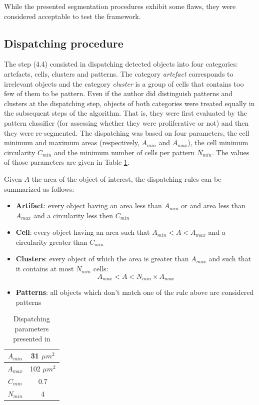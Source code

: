 While the presented segmentation procedures exhibit some flaws, they were considered acceptable to test the  framework.

\subsection{Dispatching procedure}

The step (4.4) consisted in dispatching detected objects into four categories: artefacts, cells, clusters and patterns. The category \textit{artefact} corresponds to irrelevant objects and the category \textit{cluster} is a group of cells that contains too few of them to be pattern. Even if the author did distinguish patterns and clusters at the dispatching step, objects of both categories were treated equally in the subsequent steps of the algorithm. That is, they were first evaluated by the pattern classifier (for assessing whether they were proliferative or not) and then they were re-segmented. The dispatching was based on four parameters, the cell minimum and maximum areas (respectively, $A_{min}$ and $A_{max}$), the cell minimum circularity $C_{min}$ and the minimum number of cells per pattern $N_{min}$. The values of those parameters are given in Table \ref{tab:adeb_disp_rules}. 

Given $A$ the area of the object of interest, the dispatching rules can be summarized as follows:

\begin{itemize}
	\item \textbf{Artifact}: every object having an area less than $A_{min}$ or and area less than $A_{max}$ and a circularity less then $C_{min}$
	\item \textbf{Cell}: every object having an area such that $A_{min} < A < A_{max}$ and a circularity greater than $C_{min}$
	\item \textbf{Clusters}: every object of which the area is greater than $A_{max}$ and such that it contains at most $N_{min}$ cells:
	\[
		A_{max} < A < N_{min} \times A_{max}
	\]
	\item \textbf{Patterns}: all objects which don't match one of the rule above are considered patterns
\end{itemize}

\begin{table}
	\center
	\begin{tabular}{|c|c|}
		\hline
		$A_{min}$ & 31 $\mu m^2$\\
		\hline
		$A_{max}$ & 102 $\mu m^2$\\
		\hline
		$C_{min}$ & 0.7 \\
		\hline
		$N_{min}$ & 4\\
		\hline
	\end{tabular}
	\caption{Dispatching parameters presented in \cite{adeblire2013}}
	\label{tab:adeb_disp_rules}
\end{table}

